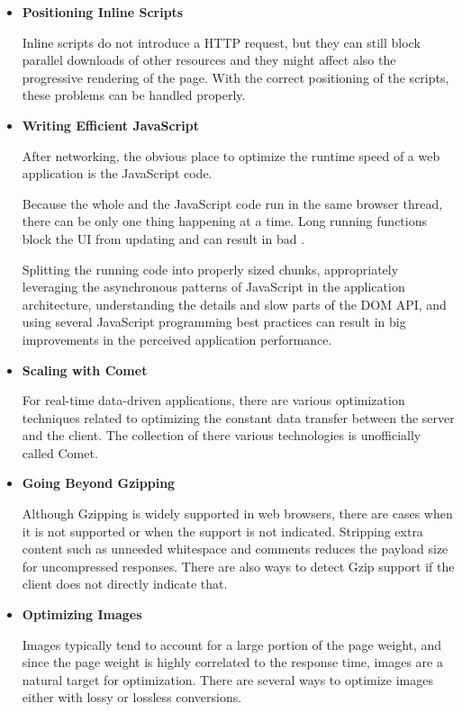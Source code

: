 \begin{itemize}
\item \textbf{Positioning Inline Scripts}

  Inline scripts do not introduce a HTTP request, but they can still
  block parallel downloads of other resources and they might affect
  also the progressive rendering of the page. With the correct
  positioning of the scripts, these problems can be handled properly.

\item \textbf{Writing Efficient JavaScript}

  After networking, the obvious place to optimize the runtime speed of
  a web application is the JavaScript code.

  Because the whole  and the JavaScript code run in the same
  browser thread, there can be only one thing happening at a
  time. Long running functions block the UI from updating and can
  result in bad .

  Splitting the running code into properly sized chunks, appropriately
  leveraging the asynchronous patterns of JavaScript in the
  application architecture, understanding the details and slow parts
  of the DOM API, and using several JavaScript programming best
  practices can result in big improvements in the perceived
  application performance. \cite{zakas2010high}

\item \textbf{Scaling with Comet}

  For real-time data-driven applications, there are various
  optimization techniques related to optimizing the constant data
  transfer between the server and the client. The collection of there
  various technologies is unofficially called Comet.

\item \textbf{Going Beyond Gzipping}

  Although Gzipping is widely supported in web browsers, there are
  cases when it is not supported or when the support is not
  indicated. Stripping extra content such as unneeded whitespace and
  comments reduces the payload size for uncompressed responses. There
  are also ways to detect Gzip support if the client does not directly
  indicate that.

\item \textbf{Optimizing Images}

  Images typically tend to account for a large portion of the page
  weight, and since the page weight is highly correlated to the
  response time, images are a natural target for optimization. There
  are several ways to optimize images either with lossy or lossless
  conversions.


\end{itemize}
